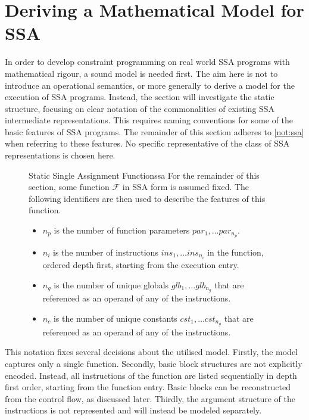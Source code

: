 \newpage
\section{Deriving a Mathematical Model for SSA}

    In order to develop constraint programming on real world SSA programs with
    mathematical rigour, a sound model is needed first.
    The aim here is not to introduce an operational semantics, or more
    generally to derive a model for the execution of SSA programs.
    Instead, the section will investigate the static structure, focusing on
    clear notation of the commonalities of existing SSA intermediate
    representations.
    This requires naming conventions for some of the basic features of
    SSA programs.
    The remainder of this section adheres to \autoref{not:ssa} when referring to
    these features.
    No specific representative of the class of SSA representations is chosen
    here.

\begin{figure}[h]
\begin{notation}{Static Single Assignment Function}{ssa}
    For the remainder of this section, some function $\mathcal F$ in SSA form is
    assumed fixed. 
    The following identifiers are then used to describe the features of this
    function.

    \begin{itemize}
    \item $n_p$ is the number of function parameters $par_1,\dots par_{n_p}$.
    \item $n_i$ is the number of instructions $ins_1,\dots ins_{n_i}$ in the
          function, ordered depth first, starting from the execution entry.
    \item $n_g$ is the number of unique globals $glb_1,\dots glb_{n_g}$ that are
          referenced as an operand of any of the instructions.
    \item $n_c$ is the number of unique constants $cst_1,\dots cst_{n_g}$ that
          are referenced as an operand of any of the instructions.
    \end{itemize}
\end{notation}
\end{figure}

    This notation fixes several decisions about the utilised model.
    Firstly, the model captures only a single function.
    Secondly, basic block structures are not explicitly encoded.
    Instead, all instructions of the function are listed sequentially in depth
    first order, starting from the function entry.
    Basic blocks can be reconstructed from the control flow, as discussed later.
    Thirdly, the argument structure of the instructions is not represented and
    will instead be modeled separately.

